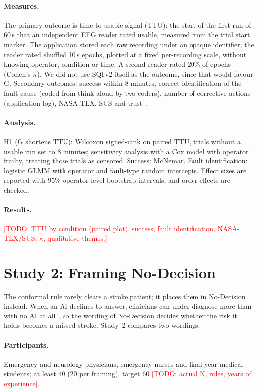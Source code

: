 \documentclass[sigconf,review,anonymous]{acmart}
\newcommand{\TODO}[1]{\textcolor{red}{[TODO: #1]}}
\newcommand{\sqiv}{SQI\,v2}
\begin{document}
\paragraph{Measures.}
The primary outcome is time to usable signal (TTU): the start of the first run of 60\,s that an independent EEG reader rated usable, measured from the trial start marker.
The application stored each raw recording under an opaque identifier; the reader rated shuffled 10\,s epochs, plotted at a fixed per-recording scale, without knowing operator, condition or time.
A second reader rated 20\% of epochs (Cohen's $\kappa$).
We did not use \sqiv{} itself as the outcome, since that would favour G.
Secondary outcomes: success within 8 minutes, correct identification of the fault cause (coded from think-aloud by two coders), number of corrective actions (application log), NASA-TLX, SUS and trust~\cite{jian2000trust}.

\paragraph{Analysis.}
H1 (G shortens TTU): Wilcoxon signed-rank on paired TTU, trials without a usable run set to 8 minutes; sensitivity analysis with a Cox model with operator frailty, treating those trials as censored.
Success: McNemar. Fault identification: logistic GLMM with operator and fault-type random intercepts. Effect sizes are reported with 95\% operator-level bootstrap intervals, and order effects are checked.

\paragraph{Results.}
\TODO{TTU by condition (paired plot), success, fault identification, NASA-TLX/SUS, $\kappa$, qualitative themes.}

\section{Study 2: Framing No-Decision}
\label{sec:study2}
The conformal rule rarely clears a stroke patient; it places them in No-Decision instead.
When an AI declines to answer, clinicians can under-diagnose more than with no AI at all~\cite{jabbour2025}, so the wording of No-Decision decides whether the risk it holds becomes a missed stroke.
Study~2 compares two wordings.

\paragraph{Participants.}
Emergency and neurology physicians, emergency nurses and final-year medical students; at least 40 (20 per framing), target 60 \TODO{actual N, roles, years of experience}.
\end{document}
